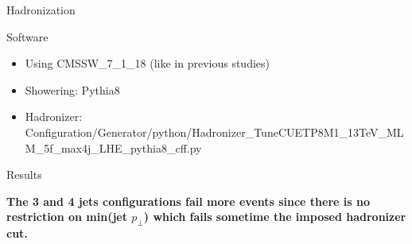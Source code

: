 \documentclass[8pt]{beamer}
\begin{document}
\begin{frame}{Hadronization}

\begin{block}{Software}

  \begin{itemize}
    \item Using CMSSW\_7\_1\_18 (like in previous studies)
    \item Showering: Pythia8
    \item Hadronizer: \tiny{Configuration/Generator/python/Hadronizer\_TuneCUETP8M1\_13TeV\_MLM\_5f\_max4j\_LHE\_pythia8\_cff.py}
  \end{itemize}

\end{block}

\begin{block}{Results}


\end{block}

\begin{center}
\textbf{The 3 and 4 jets configurations fail more events since there is no restriction on min(jet $p_\perp$) which fails sometime the imposed hadronizer cut.}
\end{center}

\end{frame}
\end{document}
